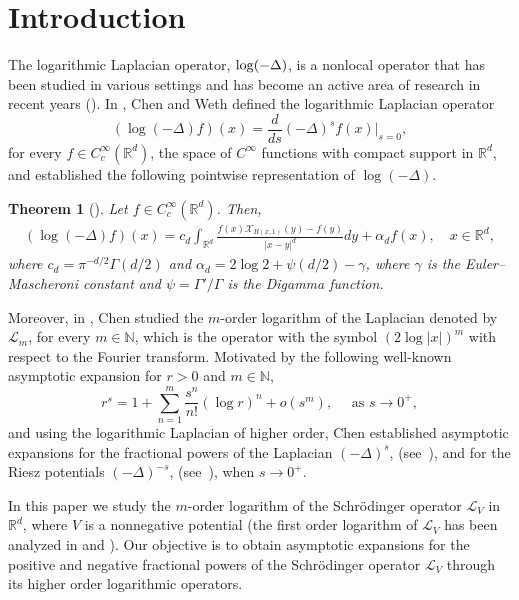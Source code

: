 \documentclass[10pt, a4paper, reqno]{amsart}
\newtheorem{ThA}{Theorem}
\theoremstyle{definition}
\theoremstyle{remark}
\numberwithin{equation}{section}
\begin{document}
\section{Introduction}

The logarithmic Laplacian operator, ${\rm log}(-\Delta)$, is a nonlocal operator that has been studied in various settings and has become an active area of research in recent years (\cite{ChChH, ChV2, ChV1, ChW, RCh, RChX, Feu1, Feu2, JSW, LW, Lee, Lee2, LL}). 
In \cite{ChW}, Chen and Weth defined the logarithmic Laplacian operator 
\[(\log(-\Delta)f)(x) = \frac{d}{ds}(-\Delta)^sf(x)\big\vert_{s=0},\] 
for every $f\in C_c^\infty(\mathbb R^d)$, the space of $C^\infty$ functions with compact support in $\mathbb R^d$, and established the following pointwise representation of $\log(-\Delta)$. 

\begin{ThA}[{\cite[Theorem~1.1]{ChW}}]\label{ThA}
Let $f\in C_c^\infty(\mathbb R^d)$. Then,
\begin{align*}
(\log(-\Delta)f)(x)
=c_d\int_{\mathbb R^d}\frac{f(x)\mathcal X_{B(x,1)}(y)-f(y)}{|x-y|^d}dy+\alpha_df(x),\quad x\in \mathbb R^d,
\end{align*}
where
$c_d=\pi ^{-d/2}\Gamma (d/2)$ and $\alpha _d=2\log 2+ \psi (d/2)-\gamma$, where $\gamma$ is the Euler--Mascheroni constant and $\psi =\Gamma'/\Gamma$ is the Digamma function.
\end{ThA}

Moreover, in \cite{Ch}, Chen studied the $m$-order logarithm of the Laplacian denoted by $\mathcal L_m$, for every $m\in \mathbb N$, which is the operator with the symbol $(2\log|x|)^m$ with respect to the Fourier transform. Motivated by the following well-known asymptotic expansion for $r>0$ and $m\in \mathbb N$,
\[
    r^s=1+\sum_{n=1}^m\frac{s^n}{n!}(\log r)^n+o(s^m),\quad \mbox{ as }s\rightarrow 0^+,
\]
and using the logarithmic Laplacian of higher order, Chen 
established asymptotic expansions for the fractional powers of the Laplacian $(-\Delta)^s$,  (see~\cite[Theorem~1.2]{Ch}), and for the Riesz potentials $(-\Delta)^{-s}$,  (see~\cite[Theorem~1.1]{Ch}), when $s\rightarrow 0^+$.

In this paper we study the $m$-order logarithm of the Schr\"odinger operator $\mathcal L_V$ in $\mathbb R^d$, where $V$ is a nonnegative potential (the first order logarithm of $\mathcal L_V$ has been analyzed in \cite{BDFQ} and \cite{BdLR}). Our objective is to obtain asymptotic expansions for the positive and negative fractional powers of the Schr\"odinger operator $\mathcal L_V$ through its higher order logarithmic operators.
\end{document}
